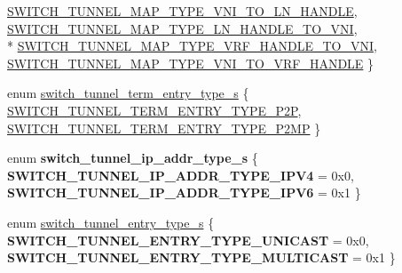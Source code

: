 \begin{DoxyCompactItemize}
\hyperlink{group__Tunnel_ggac912a56b58661dcec8846d16be80de31a242942905c6a329405e8c15d034e2bd9}{S\+W\+I\+T\+C\+H\+\_\+\+T\+U\+N\+N\+E\+L\+\_\+\+M\+A\+P\+\_\+\+T\+Y\+P\+E\+\_\+\+V\+N\+I\+\_\+\+T\+O\+\_\+\+L\+N\+\_\+\+H\+A\+N\+D\+L\+E}, 
\hyperlink{group__Tunnel_ggac912a56b58661dcec8846d16be80de31afea4a258a3d486412f4c1f92e5eec89d}{S\+W\+I\+T\+C\+H\+\_\+\+T\+U\+N\+N\+E\+L\+\_\+\+M\+A\+P\+\_\+\+T\+Y\+P\+E\+\_\+\+L\+N\+\_\+\+H\+A\+N\+D\+L\+E\+\_\+\+T\+O\+\_\+\+V\+N\+I}, 
\\*
\hyperlink{group__Tunnel_ggac912a56b58661dcec8846d16be80de31ab2a5e2ef901607054aafb0dbe75e4612}{S\+W\+I\+T\+C\+H\+\_\+\+T\+U\+N\+N\+E\+L\+\_\+\+M\+A\+P\+\_\+\+T\+Y\+P\+E\+\_\+\+V\+R\+F\+\_\+\+H\+A\+N\+D\+L\+E\+\_\+\+T\+O\+\_\+\+V\+N\+I}, 
\hyperlink{group__Tunnel_ggac912a56b58661dcec8846d16be80de31abcd2f59cdb7e0243eab22dba7637e617}{S\+W\+I\+T\+C\+H\+\_\+\+T\+U\+N\+N\+E\+L\+\_\+\+M\+A\+P\+\_\+\+T\+Y\+P\+E\+\_\+\+V\+N\+I\+\_\+\+T\+O\+\_\+\+V\+R\+F\+\_\+\+H\+A\+N\+D\+L\+E}
 \}
\item 
enum \hyperlink{group__Tunnel_gaf17d995b62e3e95fc88052f69156317d}{switch\+\_\+tunnel\+\_\+term\+\_\+entry\+\_\+type\+\_\+s} \{ \hyperlink{group__Tunnel_ggaf17d995b62e3e95fc88052f69156317da3c45f1ca2c0530e414a1c0b71dd02517}{S\+W\+I\+T\+C\+H\+\_\+\+T\+U\+N\+N\+E\+L\+\_\+\+T\+E\+R\+M\+\_\+\+E\+N\+T\+R\+Y\+\_\+\+T\+Y\+P\+E\+\_\+\+P2\+P}, 
\hyperlink{group__Tunnel_ggaf17d995b62e3e95fc88052f69156317da4c6f3a5d2b6cdaf4b84b9a880f670228}{S\+W\+I\+T\+C\+H\+\_\+\+T\+U\+N\+N\+E\+L\+\_\+\+T\+E\+R\+M\+\_\+\+E\+N\+T\+R\+Y\+\_\+\+T\+Y\+P\+E\+\_\+\+P2\+M\+P}
 \}
\item 
\hypertarget{group__Tunnel_ga0f1af995653a7dca16375318237a87f4}{enum {\bfseries switch\+\_\+tunnel\+\_\+ip\+\_\+addr\+\_\+type\+\_\+s} \{ {\bfseries S\+W\+I\+T\+C\+H\+\_\+\+T\+U\+N\+N\+E\+L\+\_\+\+I\+P\+\_\+\+A\+D\+D\+R\+\_\+\+T\+Y\+P\+E\+\_\+\+I\+P\+V4} = 0x0, 
{\bfseries S\+W\+I\+T\+C\+H\+\_\+\+T\+U\+N\+N\+E\+L\+\_\+\+I\+P\+\_\+\+A\+D\+D\+R\+\_\+\+T\+Y\+P\+E\+\_\+\+I\+P\+V6} = 0x1
 \}}\label{group__Tunnel_ga0f1af995653a7dca16375318237a87f4}

\item 
enum \hyperlink{group__Tunnel_gaa171c0101a1f87af3f4cc2d44343e4a0}{switch\+\_\+tunnel\+\_\+entry\+\_\+type\+\_\+s} \{ {\bfseries S\+W\+I\+T\+C\+H\+\_\+\+T\+U\+N\+N\+E\+L\+\_\+\+E\+N\+T\+R\+Y\+\_\+\+T\+Y\+P\+E\+\_\+\+U\+N\+I\+C\+A\+S\+T} = 0x0, 
{\bfseries S\+W\+I\+T\+C\+H\+\_\+\+T\+U\+N\+N\+E\+L\+\_\+\+E\+N\+T\+R\+Y\+\_\+\+T\+Y\+P\+E\+\_\+\+M\+U\+L\+T\+I\+C\+A\+S\+T} = 0x1
 \}
\end{DoxyCompactItemize}
